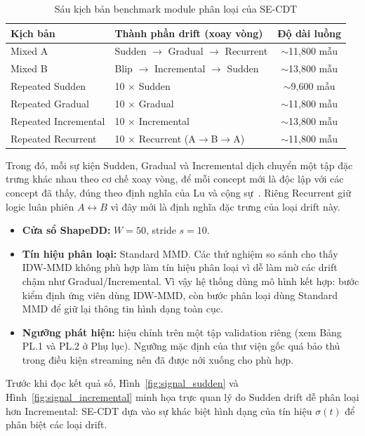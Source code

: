 \begin{table}[H]
	\centering
	\caption{Sáu kịch bản benchmark module phân loại của SE-CDT}
	\label{tab:classification-scenarios}
	\begin{tabular}{|l|l|c|}
		\hline
		\textbf{Kịch bản} & \textbf{Thành phần drift (xoay vòng)} & \textbf{Độ dài luồng} \\
		\hline
		Mixed A        & Sudden $\to$ Gradual $\to$ Recurrent   & $\sim$11,800 mẫu \\
		Mixed B        & Blip $\to$ Incremental $\to$ Sudden    & $\sim$13,800 mẫu \\
		Repeated Sudden      & 10 $\times$ Sudden                     & $\sim$9,600 mẫu  \\
		Repeated Gradual     & 10 $\times$ Gradual                    & $\sim$11,800 mẫu \\
		Repeated Incremental & 10 $\times$ Incremental                & $\sim$13,800 mẫu \\
		Repeated Recurrent   & 10 $\times$ Recurrent (A$\to$B$\to$A)  & $\sim$11,800 mẫu \\
		\hline
	\end{tabular}
\end{table}

Trong đó, mỗi sự kiện Sudden, Gradual và Incremental dịch chuyển một tập đặc trưng khác nhau theo cơ chế xoay vòng, để mỗi concept mới là độc lập với các concept đã thấy, đúng theo định nghĩa của Lu và cộng sự~\cite{lu2018learning}. Riêng Recurrent giữ logic luân phiên $A \leftrightarrow B$ vì đây mới là định nghĩa đặc trưng của loại drift này.

\begin{itemize}
	\item \textbf{Cửa sổ ShapeDD:} $W = 50$, stride $s = 10$.
	\item \textbf{Tín hiệu phân loại:} Standard MMD. Các thử nghiệm so sánh cho thấy IDW-MMD không phù hợp làm tín hiệu phân loại vì dễ làm mờ các drift chậm như Gradual/Incremental. Vì vậy hệ thống dùng mô hình kết hợp: bước kiểm định ứng viên dùng IDW-MMD, còn bước phân loại dùng Standard MMD để giữ lại thông tin hình dạng toàn cục.
	\item \textbf{Ngưỡng phát hiện:} hiệu chỉnh trên một tập validation riêng (xem Bảng PL.1 và PL.2 ở Phụ lục). Ngưỡng mặc định của thư viện gốc quá bảo thủ trong điều kiện streaming nên đã được nới xuống cho phù hợp.
\end{itemize}

Trước khi đọc kết quả số, Hình~\ref{fig:signal_sudden} và Hình~\ref{fig:signal_incremental} minh họa trực quan lý do Sudden drift dễ phân loại hơn Incremental: SE-CDT dựa vào sự khác biệt hình dạng của tín hiệu $\sigma(t)$ để phân biệt các loại drift.

